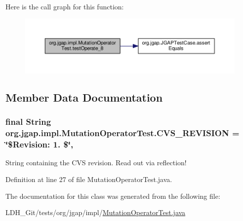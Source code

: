 Here is the call graph for this function\-:
\nopagebreak
\begin{figure}[H]
\begin{center}
\leavevmode
\includegraphics[width=350pt]{classorg_1_1jgap_1_1impl_1_1_mutation_operator_test_a5aaf5d8acf4eb020ca676d1103af5286_cgraph}
\end{center}
\end{figure}




\subsection{Member Data Documentation}
\hypertarget{classorg_1_1jgap_1_1impl_1_1_mutation_operator_test_aaba6b52460304a4709055285d083403a}{
\subsubsection[{C\-V\-S\-\_\-\-R\-E\-V\-I\-S\-I\-O\-N}]{\setlength{\rightskip}{0pt plus 5cm}final String org.\-jgap.\-impl.\-Mutation\-Operator\-Test.\-C\-V\-S\-\_\-\-R\-E\-V\-I\-S\-I\-O\-N = \char`\"{}\$Revision\-: 1. \$\char`\"{}\hspace{0.3cm}{\ttfamily [static]}, {\ttfamily [private]}}}\label{classorg_1_1jgap_1_1impl_1_1_mutation_operator_test_aaba6b52460304a4709055285d083403a}
String containing the C\-V\-S revision. Read out via reflection! 

Definition at line 27 of file Mutation\-Operator\-Test.\-java.



The documentation for this class was generated from the following file\-:\begin{DoxyCompactItemize}
\item 
L\-D\-H\-\_\-\-Git/tests/org/jgap/impl/\hyperlink{_mutation_operator_test_8java}{Mutation\-Operator\-Test.\-java}\end{DoxyCompactItemize}
